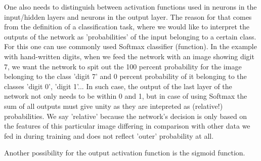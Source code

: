 One also needs to distinguish between activation functions used in neurons in the input/hidden layers and neurons in the output layer. The reason for that comes from the definition of a classification task, where we would like to interpret the outputs of the network as 'probabilities' of the input belonging to a certain class. For this one can use commonly used Softmax classifier (function). In the example with hand-written digits, when we feed the network with an image showing digit 7, we want the network to spit out the 100 percent probability for the image belonging to the class 'digit 7' and 0 percent probability of it belonging to the classes 'digit 0', 'digit 1'... In such case, the output of the last layer of the network not only needs to be within 0 and 1, but in case of using Softmax the sum of all outputs must give unity as they are intepreted as (relative!) probabilities. We say 'relative' because the network's decision is only based on the features of this particular image differing in comparison with other data we fed in during training and does not reflect 'outer' probability at all. 

Another possibility for the output activation function is the sigmoid function. 


